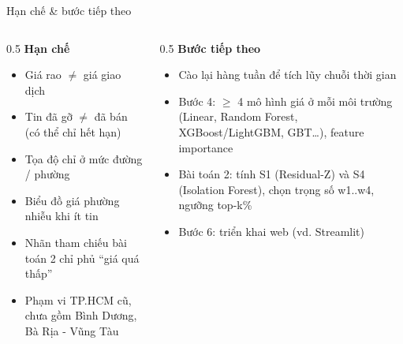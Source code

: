 \documentclass[aspectratio=169,11pt]{beamer}
\begin{document}
\begin{frame}{Hạn chế \& bước tiếp theo}
  \begin{columns}[T]
    \begin{column}{0.5\linewidth}
      \textbf{Hạn chế}
      \small
      \begin{itemize}
        \item Giá rao $\neq$ giá giao dịch
        \item Tin đã gỡ $\neq$ đã bán (có thể chỉ hết hạn)
        \item Tọa độ chỉ ở mức đường / phường
        \item Biểu đồ giá phường nhiễu khi ít tin
        \item Nhãn tham chiếu bài toán 2 chỉ phủ ``giá quá thấp''
        \item Phạm vi TP.HCM cũ, chưa gồm Bình Dương, Bà Rịa - Vũng Tàu
      \end{itemize}
    \end{column}
    \begin{column}{0.5\linewidth}
      \textbf{Bước tiếp theo}
      \small
      \begin{itemize}
        \item Cào lại hàng tuần để tích lũy chuỗi thời gian
        \item Bước 4: $\ge$ 4 mô hình giá ở mỗi môi trường (Linear, Random Forest, XGBoost/LightGBM, GBT\dots), feature importance
        \item Bài toán 2: tính S1 (Residual-Z) và S4 (Isolation Forest), chọn trọng số w1..w4, ngưỡng top-k\%
        \item Bước 6: triển khai web (vd. Streamlit)
      \end{itemize}
    \end{column}
  \end{columns}
\end{frame}
\end{document}
